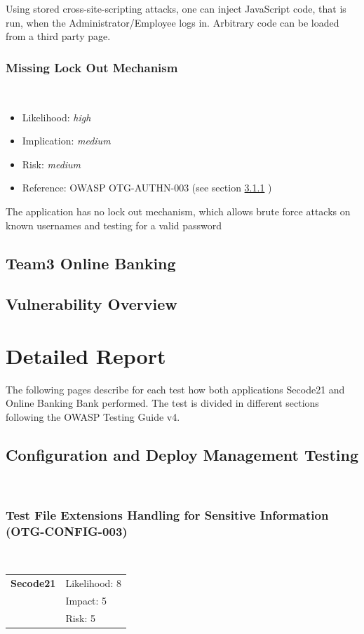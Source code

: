 \documentclass[headsepline,footsepline,footinclude=false,oneside,fontsize=11pt,paper=a4,listof=totoc,bibliography=totoc]{scrbook} %
\begin{document}
Using stored cross-site-scripting attacks, one can inject JavaScript code, that is run, when the Administrator/Employee logs in. Arbitrary code can be loaded from a third party page.

\subsection{Missing Lock Out Mechanism}\label{Missing Lock Out Mechanism}\
\begin{itemize}
	\item Likelihood: \textit{high}
	\item Implication: \textit{medium}
	\item Risk: \textit{medium}
	\item Reference: OWASP OTG-AUTHN-003 (see section \ref{} )
\end{itemize}
The application has no lock out mechanism, which allows brute force attacks on known usernames and testing
for a valid password

\section{Team3 Online Banking}

\section{Vulnerability Overview}

\chapter{Detailed Report}

The following pages describe for each test how both applications Secode21 and Online Banking Bank
performed. The test is divided in different sections following the OWASP Testing Guide v4.

\pagebreak


\section{Configuration and Deploy Management Testing}\
\subsection{Test File Extensions Handling for Sensitive Information (OTG-CONFIG-003)}\

\begin{tabular}{cR{12cm}}
	\textbf{Secode21} & Likelihood: 8\\& Impact: 5\\& Risk: 5
\end{tabular}
\end{document}

